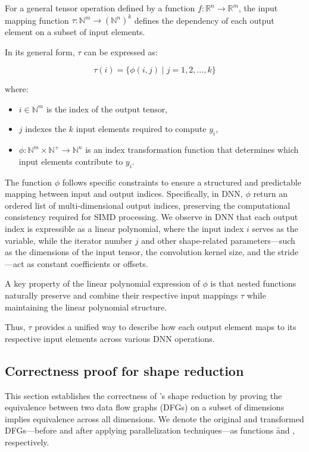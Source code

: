 For a general tensor operation defined by a function $f: \mathbb{R}^n \to \mathbb{R}^m$, the input mapping function $\tau: \mathbb{N}^m \to (\mathbb{N}^{n})^k$ defines the dependency of each output element on a subset of input elements.

In its general form, $\tau$ can be expressed as:

\[
\tau(i) = \{ \phi(i, j) \mid j = 1, 2, \dots, k \}
\]

where:
\begin{itemize}
    \item $i \in \mathbb{N}^m$ is the index of the output tensor,
    \item $j$ indexes the $k$ input elements required to compute $y_i$,
    \item $\phi: \mathbb{N}^m \times \mathbb{N}^+ \to \mathbb{N}^n$ is an index transformation function that determines which input elements contribute to $y_i$.
\end{itemize}

The function $\phi$ follows specific constraints to ensure a structured and predictable mapping between input and output indices. Specifically, in DNN, $\phi$ return an ordered list of multi-dimensional output indices, preserving the computational consistency required for SIMD processing. We observe in DNN that each output index is expressible as a linear polynomial, where the input index $i$ serves as the variable, while the iterator number $j$ and other shape-related parameters—such as the dimensions of the input tensor, the convolution kernel size, and the stride—act as constant coefficients or offsets.

A key property of the linear polynomial expression of $\phi$ is that nested functions naturally preserve and combine their respective input mappings $\tau$ while maintaining the linear polynomial structure.


Thus, $\tau$ provides a unified way to describe how each output element maps to its respective input elements across various DNN operations.

\subsection{Correctness proof for shape reduction}

This section establishes the correctness of \sys's shape reduction
by proving the equivalence between two data flow graphs (DFGs) on a subset of dimensions
implies equivalence across all dimensions.
We denote the original and transformed DFGs---before and after applying parallelization techniques---as functions
\f and \g, respectively.

